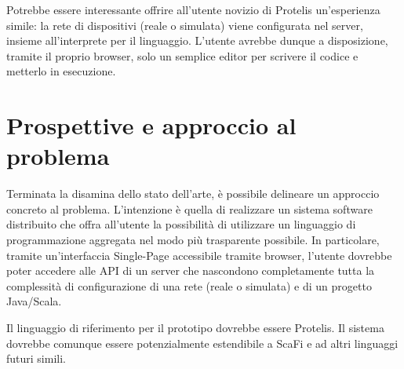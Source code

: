   Potrebbe essere interessante offrire all'utente novizio di Protelis un'esperienza simile:
  la rete di dispositivi (reale o simulata) viene configurata nel server, insieme all'interprete per il linguaggio.
  L'utente avrebbe dunque a disposizione, tramite il proprio browser, solo un semplice editor per scrivere il codice e metterlo in esecuzione.

  \section{Prospettive e approccio al problema}\label{sec:prospective}


  Terminata la disamina dello stato dell'arte, è possibile delineare un approccio concreto al problema.
  L'intenzione è quella di realizzare un sistema software distribuito che offra all'utente la possibilità di utilizzare un linguaggio di programmazione aggregata nel modo più trasparente possibile.
  In particolare, tramite un'interfaccia Single-Page accessibile tramite browser, l'utente dovrebbe poter accedere alle API di un server che nascondono completamente tutta la complessità di configurazione di una rete (reale o simulata) e di un progetto Java/Scala.

  Il linguaggio di riferimento per il prototipo dovrebbe essere Protelis.
  Il sistema dovrebbe comunque essere potenzialmente estendibile a ScaFi e ad altri linguaggi futuri simili.
